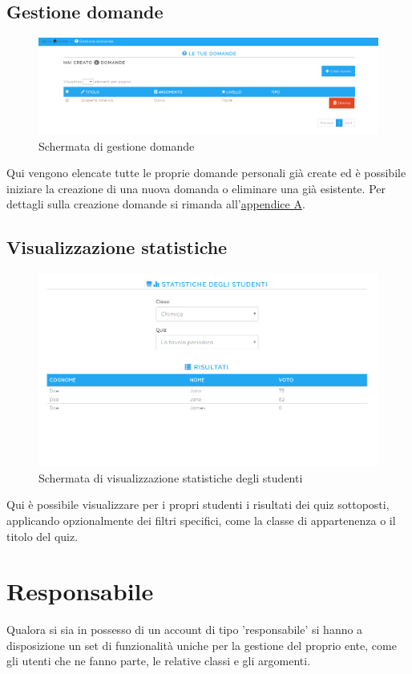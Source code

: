 \documentclass[a4paper, titlepage]{article}
\begin{document}
	 \newpage
	 \subsection{Gestione domande}
	 \begin{figure}[!h]
	 	\centering
	 	\includegraphics[scale=0.33]{Img/screen_gestioneDomande.png}
	 	\caption{Schermata di gestione domande}
	 \end{figure}
	 Qui vengono elencate tutte le proprie domande personali già create ed è possibile iniziare la creazione di una nuova domanda o eliminare una già esistente. Per dettagli sulla creazione domande si rimanda all'\hyperref[domande]{appendice A}.
	 
	 \subsection{Visualizzazione statistiche}
	 \begin{figure}[!h]
	 	\centering
	 	\includegraphics[scale=0.33]{Img/screen_StatisticheStudenti.png}
	 	\caption{Schermata di visualizzazione statistiche degli studenti}
	 \end{figure}
	 Qui è possibile visualizzare per i propri studenti i risultati dei quiz sottoposti, applicando opzionalmente dei filtri specifici, come la classe di appartenenza o il titolo del quiz.
	 
	 \newpage
	 \section{Responsabile}
	 Qualora si sia in possesso di un account di tipo 'responsabile' si hanno a disposizione un set di funzionalità uniche per la gestione del proprio ente, come gli utenti che ne fanno parte, le relative classi e gli argomenti.
	 
\end{document}
